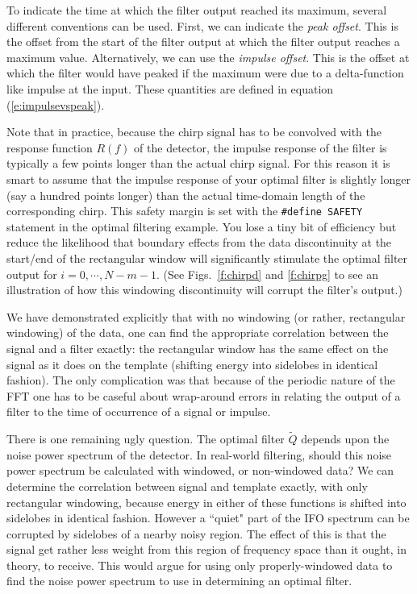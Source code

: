 To indicate the time at which the filter output reached its maximum,
several different conventions can be used.  First, we can indicate the
{\it peak offset}.  This is the offset from the start of the filter output
at which the filter output reaches a maximum value.  Alternatively,
we can use the {\it impulse offset}.  This is the
offset at which the filter would have peaked if the maximum were due
to a delta-function like impulse at the input. These quantities
are defined in equation (\ref{e:impulsevspeak}).

Note that in practice, because the chirp signal has to be convolved
with the response function $R(f)$ of the detector, the impulse response
of the filter is typically a few points longer than the actual chirp
signal.  For this reason it is smart to assume that the impulse
response of your optimal filter is slightly longer (say a hundred
points longer) than the actual time-domain length of the corresponding
chirp.  This safety margin is set with the
{\tt {\#d}efine SAFETY} statement in the optimal filtering example.
You lose a tiny bit of efficiency but reduce the likelihood
that boundary effects from the data discontinuity at the start/end of
the rectangular window will significantly stimulate the optimal filter
output for $i=0,\cdots,N-m-1$. (See Figs.~\ref{f:chirpd} and
\ref{f:chirpg} to see an illustration of how this windowing
discontinuity will corrupt the filter's output.)

We have demonstrated explicitly that with no windowing (or rather,
rectangular windowing) of the data, one can find the appropriate
correlation between the signal and a filter exactly: the rectangular
window has the same effect on the signal as it does on the template
(shifting energy into sidelobes in identical fashion).  The only
complication was that because of the periodic nature of the FFT one has
to be caseful about wrap-around errors in relating the output of a
filter to the time of occurrence of a signal or impulse.

There is one remaining ugly question.  The optimal filter $\tilde Q$
depends upon the noise power spectrum of the detector.  In real-world
filtering, should this noise power spectrum be calculated with
windowed, or non-windowed data?  We can determine the correlation
between signal and template exactly, with only rectangular windowing,
because energy in either of these functions is shifted into sidelobes
in identical fashion.  However a ``quiet" part of the IFO spectrum can
be corrupted by sidelobes of a nearby noisy region.  The effect of this
is that the signal get rather less weight from this region of frequency
space than it ought, in theory, to receive.  This would argue for using
only properly-windowed data to find the noise power spectrum to use in
determining an optimal filter.

